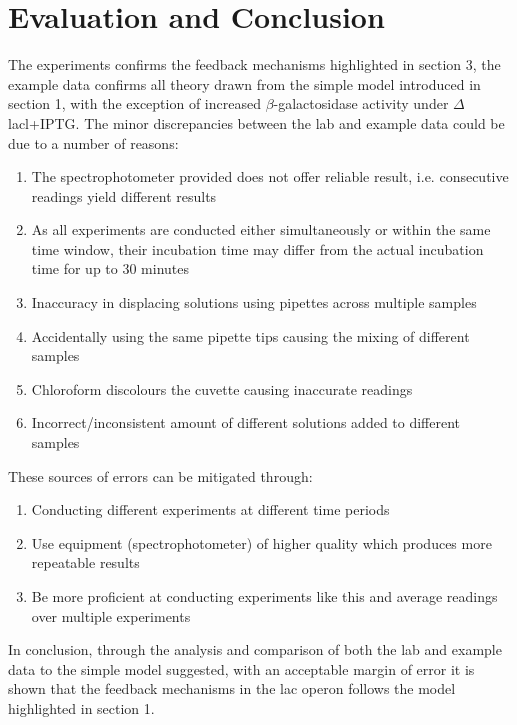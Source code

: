 \documentclass{article}
\begin{document}
\section{Evaluation and Conclusion}
The experiments confirms the feedback mechanisms highlighted in section 3, the example data confirms all theory drawn from the simple model introduced in section 1, with the exception of increased $\beta$-galactosidase activity under $\Delta$lacl+IPTG. The minor discrepancies between the lab and example data could be due to a number of reasons:
\begin{enumerate}
  \item The spectrophotometer provided does not offer reliable result, i.e. consecutive readings yield different results
  \item As all experiments are conducted either simultaneously or within the same time window, their incubation time may differ from the actual incubation time for up to 30 minutes
  \item Inaccuracy in displacing solutions using pipettes across multiple samples
  \item Accidentally using the same pipette tips causing the mixing of different samples
  \item Chloroform discolours the cuvette causing inaccurate readings
  \item Incorrect/inconsistent amount of different solutions added to different samples
\end{enumerate}
These sources of errors can be mitigated through:
\begin{enumerate}
  \item Conducting different experiments at different time periods
  \item Use equipment (spectrophotometer) of higher quality which produces more repeatable results
  \item Be more proficient at conducting experiments like this and average readings over multiple experiments
\end{enumerate}
In conclusion, through the analysis and comparison of both the lab and example data to the simple model suggested, with an acceptable margin of error it is shown that the feedback mechanisms in the lac operon follows the model highlighted in section 1.



\end{document}
